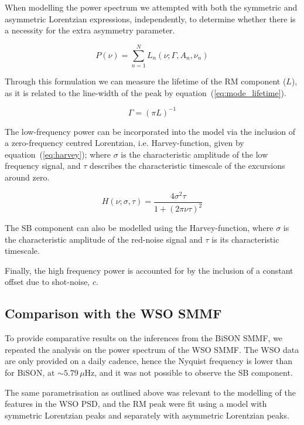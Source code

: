 When modelling the power spectrum we attempted with both the symmetric and asymmetric Lorentzian expressions, independently, to determine whether there is a necessity for the extra asymmetry parameter.

\begin{equation}
P(\nu) = \sum_{n=1}^{N} L_n(\nu; \Gamma, A_n, \nu_n)
\label{eq:lorentzian_fit}
\end{equation}


Through this formulation we can measure the lifetime of the RM component ($L$), as it is related to the line-width of the peak by equation~(\ref{eq:mode_lifetime}).

\begin{equation}
\Gamma  = (\pi L)^{-1}
\label{eq:mode_lifetime}
\end{equation}


The low-frequency power can be incorporated into the model via the inclusion of a zero-frequency centred Lorentzian, i.e. Harvey-function, given by equation~(\ref{eq:harvey}); where $\sigma$ is the characteristic amplitude of the low frequency signal, and $\tau$ describes the characteristic timescale of the excursions around zero.

\begin{equation}
H(\nu; \sigma, \tau) = \frac{4{\sigma}^2\tau}{1 + (2\pi \nu\tau)^2}
\label{eq:harvey}
\end{equation}

The SB component can also be modelled using the Harvey-function, where $\sigma$ is the characteristic amplitude of the red-noise signal and $\tau$ is its characteristic timescale.

Finally, the high frequency power is accounted for by the inclusion of a constant offset due to shot-noise, $c$.


\subsection{Comparison with the WSO SMMF}

To provide comparative results on the inferences from the BiSON SMMF, we repeated the analysis on the power spectrum of the WSO SMMF. The WSO data are only provided on a daily cadence, hence the Nyquist frequency is lower than for BiSON, at $\sim 5.79 \, \mu\mathrm{Hz}$, and it was not possible to observe the SB component.

The same parametrisation as outlined above was relevant to the modelling of the features in the WSO PSD, and the RM peak were fit using a model with symmetric Lorentzian peaks and separately with asymmetric Lorentzian peaks.


